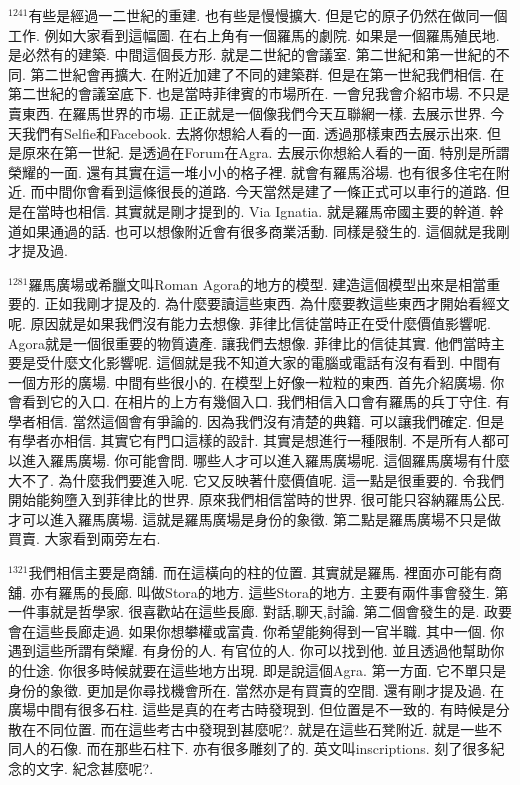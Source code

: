 \documentclass{book}
\begin{document}
$^{1241}$有些是經過一二世紀的重建.
也有些是慢慢擴大.
但是它的原子仍然在做同一個工作.
例如大家看到這幅圖.
在右上角有一個羅馬的劇院.
如果是一個羅馬殖民地.
是必然有的建築.
中間這個長方形.
就是二世紀的會議室.
第二世紀和第一世紀的不同.
第二世紀會再擴大.
在附近加建了不同的建築群.
但是在第一世紀我們相信.
在第二世紀的會議室底下.
也是當時菲律賓的市場所在.
一會兒我會介紹市場.
不只是賣東西.
在羅馬世界的市場.
正正就是一個像我們今天互聯網一樣.
去展示世界.
今天我們有Selfie和Facebook.
去將你想給人看的一面.
透過那樣東西去展示出來.
但是原來在第一世紀.
是透過在Forum在Agra.
去展示你想給人看的一面.
特別是所謂榮耀的一面.
還有其實在這一堆小小的格子裡.
就會有羅馬浴場.
也有很多住宅在附近.
而中間你會看到這條很長的道路.
今天當然是建了一條正式可以車行的道路.
但是在當時也相信.
其實就是剛才提到的.
Via Ignatia.
就是羅馬帝國主要的幹道.
幹道如果通過的話.
也可以想像附近會有很多商業活動.
同樣是發生的.
這個就是我剛才提及過.

$^{1281}$羅馬廣場或希臘文叫Roman Agora的地方的模型.
建造這個模型出來是相當重要的.
正如我剛才提及的.
為什麼要讀這些東西.
為什麼要教這些東西才開始看經文呢.
原因就是如果我們沒有能力去想像.
菲律比信徒當時正在受什麼價值影響呢.
Agora就是一個很重要的物質遺產.
讓我們去想像.
菲律比的信徒其實.
他們當時主要是受什麼文化影響呢.
這個就是我不知道大家的電腦或電話有沒有看到.
中間有一個方形的廣場.
中間有些很小的.
在模型上好像一粒粒的東西.
首先介紹廣場.
你會看到它的入口.
在相片的上方有幾個入口.
我們相信入口會有羅馬的兵丁守住.
有學者相信.
當然這個會有爭論的.
因為我們沒有清楚的典籍.
可以讓我們確定.
但是有學者亦相信.
其實它有門口這樣的設計.
其實是想進行一種限制.
不是所有人都可以進入羅馬廣場.
你可能會問.
哪些人才可以進入羅馬廣場呢.
這個羅馬廣場有什麼大不了.
為什麼我們要進入呢.
它又反映著什麼價值呢.
這一點是很重要的.
令我們開始能夠墮入到菲律比的世界.
原來我們相信當時的世界.
很可能只容納羅馬公民.
才可以進入羅馬廣場.
這就是羅馬廣場是身份的象徵.
第二點是羅馬廣場不只是做買賣.
大家看到兩旁左右.

$^{1321}$我們相信主要是商舖.
而在這橫向的柱的位置.
其實就是羅馬.
裡面亦可能有商舖.
亦有羅馬的長廊.
叫做Stora的地方.
這些Stora的地方.
主要有兩件事會發生.
第一件事就是哲學家.
很喜歡站在這些長廊.
對話,聊天,討論.
第二個會發生的是.
政要會在這些長廊走過.
如果你想攀權或富貴.
你希望能夠得到一官半職.
其中一個.
你遇到這些所謂有榮耀.
有身份的人.
有官位的人.
你可以找到他.
並且透過他幫助你的仕途.
你很多時候就要在這些地方出現.
即是說這個Agra.
第一方面.
它不單只是身份的象徵.
更加是你尋找機會所在.
當然亦是有買賣的空間.
還有剛才提及過.
在廣場中間有很多石柱.
這些是真的在考古時發現到.
但位置是不一致的.
有時候是分散在不同位置.
而在這些考古中發現到甚麼呢?.
就是在這些石凳附近.
就是一些不同人的石像.
而在那些石柱下.
亦有很多雕刻了的.
英文叫inscriptions.
刻了很多紀念的文字.
紀念甚麼呢?.
\end{document}
